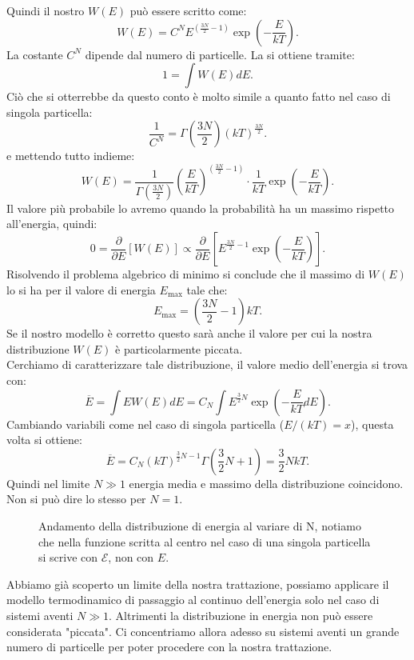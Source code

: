 Quindi il nostro $W \left( E \right) $ può essere scritto come:
\[
	W\left( E \right)  = C^{N} E^{\left( \frac{3N}{2}-1 \right)}\exp\left( -\frac{E}{kT} \right) 
.\] 
La costante $C^{N}$ dipende dal numero di particelle. La si ottiene tramite:
\[
	1 = \int W\left( E \right) dE
.\] Ciò che si otterrebbe da questo conto è molto simile a quanto fatto nel caso di singola particella:
\[
	\frac{1}{C^{N}}= \Gamma \left( \frac{3N}{2} \right) \left( kT \right) ^{\frac{3N}{2}}
.\] 
e mettendo tutto indieme:
\[
	W\left( E \right) = \frac{1}{\Gamma\left( \frac{3N}{2} \right) }\left( \frac{E}{kT} \right) ^{\left( \frac{3N}{2}-1 \right) }\cdot 
	\frac{1}{kT}\exp\left( -\frac{E}{kT} \right) 
.\] 
Il valore più probabile lo avremo quando la probabilità ha un massimo rispetto all'energia, quindi:
\[
	0 = \frac{\partial }{\partial E} \left[ W\left( E \right) \right] \propto \frac{\partial }{\partial E} \left[ E^{\frac{3N}{2}-1} \exp\left( -\frac{E}{kT} \right) \right] 
.\] 
Risolvendo il problema algebrico di minimo si conclude che il massimo di $W\left( E \right)$ lo si ha per il valore di energia $E_{\text{max}}$ tale che:
\[
	E_{\text{max}} = \left( \frac{3N}{2}-1 \right) kT
.\] 
Se il nostro modello è corretto questo sarà anche il valore per cui la nostra distribuzione $W\left( E \right)$ è particolarmente piccata. \\
Cerchiamo di caratterizzare tale distribuzione, il valore medio dell'energia si trova con:
\[
	\overline{E} = \int E W\left( E \right) dE = C_{N} \int E^{\frac{3}{2}N}\exp\left( -\frac{E}{kT} dE \right) 
.\] 
Cambiando variabili come nel caso di singola particella ($E /( kT )=x$), questa volta si ottiene:
\[
	\overline{E} = C_{N} \left( kT \right) ^{\frac{3}{2}N-1} \Gamma \left( \frac{3}{2}N +1 \right) = \frac{3}{2}N kT
.\] 
Quindi nel limite $N\gg 1$ energia media e massimo della distribuzione coincidono. Non si può dire lo stesso per $N= 1$.
\begin{figure}[H]
    \centering
    \caption{\scriptsize Andamento della distribuzione di energia al variare di N, notiamo che nella funzione scritta al centro nel caso di una singola particella si scrive con $\mathcal{E}$, non con $E$.}
    \label{fig:andamento-della-distribuzione-di-energia-al-variare-di-n}
\end{figure}
\noindent
Abbiamo già scoperto un limite della nostra trattazione, possiamo applicare il modello termodinamico di passaggio al continuo dell'energia solo nel caso di sistemi aventi $N \gg 1$. Altrimenti la distribuzione in energia non può essere considerata "piccata". Ci concentriamo allora adesso su sistemi aventi un grande numero di particelle per poter procedere con la nostra trattazione.\\
